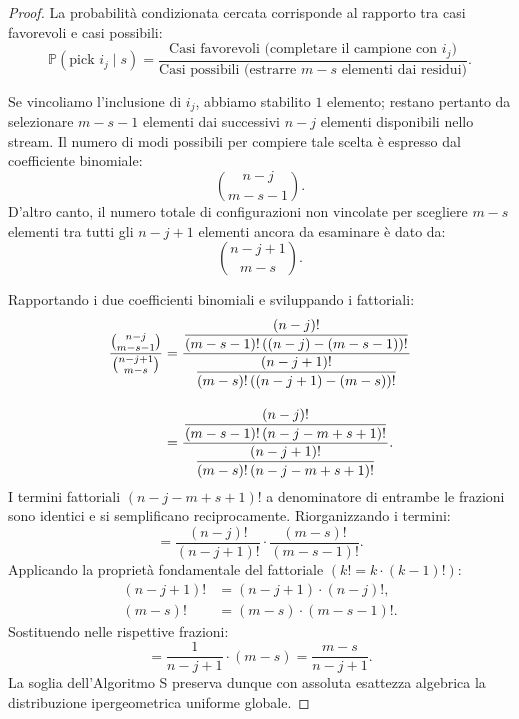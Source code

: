 \begin{proof}
La probabilità condizionata cercata corrisponde al rapporto tra casi favorevoli e casi possibili:
\begin{equation}
  \mathbb{P}(\text{pick } i_j \mid s) = \frac{\text{Casi favorevoli (completare il campione con } i_j)}{\text{Casi possibili (estrarre } m - s \text{ elementi dai residui)}}.
\end{equation}

Se vincoliamo l'inclusione di $i_j$, abbiamo stabilito $1$ elemento; restano pertanto da selezionare $m - s - 1$ elementi dai successivi $n - j$ elementi disponibili nello stream. Il numero di modi possibili per compiere tale scelta è espresso dal coefficiente binomiale:
\begin{equation}
  \binom{n - j}{m - s - 1}.
\end{equation}
D'altro canto, il numero totale di configurazioni non vincolate per scegliere $m - s$ elementi tra tutti gli $n - j + 1$ elementi ancora da esaminare è dato da:
\begin{equation}
  \binom{n - j + 1}{m - s}.
\end{equation}

Rapportando i due coefficienti binomiali e sviluppando i fattoriali:
\begin{align}
  \frac{\binom{n - j}{m - s - 1}}{\binom{n - j + 1}{m - s}} &= \frac{\dfrac{(n - j)!}{(m - s - 1)! \, ((n - j) - (m - s - 1))!}}{\dfrac{(n - j + 1)!}{(m - s)! \, ((n - j + 1) - (m - s))!}} \notag\\[1em]
  &= \frac{\dfrac{(n - j)!}{(m - s - 1)! \, (n - j - m + s + 1)!}}{\dfrac{(n - j + 1)!}{(m - s)! \, (n - j - m + s + 1)!}}.
\end{align}
I termini fattoriali $(n - j - m + s + 1)!$ a denominatore di entrambe le frazioni sono identici e si semplificano reciprocamente. Riorganizzando i termini:
\begin{equation}
  = \frac{(n - j)!}{(n - j + 1)!} \cdot \frac{(m - s)!}{(m - s - 1)!}.
\end{equation}
Applicando la proprietà fondamentale del fattoriale $(k! = k \cdot (k-1)!)$:
\begin{align}
  (n - j + 1)! &= (n - j + 1) \cdot (n - j)!, \\
  (m - s)! &= (m - s) \cdot (m - s - 1)!.
\end{align}
Sostituendo nelle rispettive frazioni:
\begin{equation}
  = \frac{1}{n - j + 1} \cdot (m - s) = \frac{m - s}{n - j + 1}.
\end{equation}
La soglia dell'Algoritmo S preserva dunque con assoluta esattezza algebrica la distribuzione ipergeometrica uniforme globale.
\end{proof}

